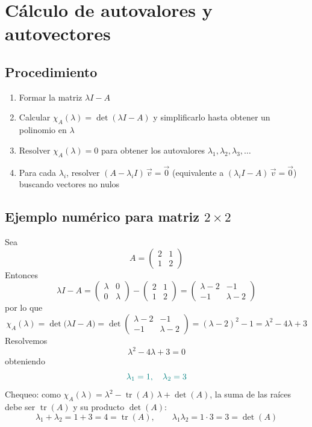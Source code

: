 \documentclass{article}
\newcommand{\vect}[1]{\vec{#1}}
\begin{document}
\section*{Cálculo de autovalores y autovectores}

\subsection*{Procedimiento}
\begin{enumerate}
  \item Formar la matriz \(\lambda I - A\)
  \item Calcular \(\chi_A(\lambda)=\det(\lambda I - A)\) y simplificarlo hasta obtener un polinomio en \(\lambda\)
  \item Resolver \(\chi_A(\lambda)=0\) para obtener los autovalores \(\lambda_1,\lambda_2, \lambda_3,\dots\)
  \item Para cada \(\lambda_i\), resolver
  \( (A - \lambda_i I)\,\vect{v} = \vect{0} \) (equivalente a \( (\lambda_i I - A)\,\vect{v} = \vect{0} \))
  buscando vectores no nulos
\end{enumerate}

\subsection*{Ejemplo numérico para matriz \(2\times2\)}
Sea
\[
A = \begin{pmatrix}
 2 & 1\\
 1 & 2
\end{pmatrix}
\]
Entonces
\[
\lambda I - A
= \begin{pmatrix}
 \lambda & 0\\
 0 & \lambda
\end{pmatrix}
- \begin{pmatrix}
 2 & 1\\
 1 & 2
\end{pmatrix}
= \begin{pmatrix}
 \lambda-2 & -1\\
 -1 & \lambda-2
\end{pmatrix}
\]
por lo que
\[
\chi_A(\lambda)
= \det\bigl(\lambda I - A\bigr)
= \det\begin{pmatrix}
 \lambda-2 & -1\\
 -1 & \lambda-2
\end{pmatrix}
= (\lambda-2)^2 - 1
= \lambda^2 - 4\lambda + 3
\]
Resolvemos
\[
\lambda^2 - 4\lambda + 3 = 0
\]
obteniendo
\[\color{teal}
\lambda_1 = 1,
\quad
\lambda_2 = 3
\]
Chequeo: como \(\chi_A(\lambda)=\lambda^2-\operatorname{tr}(A)\,\lambda+\det(A)\), la suma de las raíces debe ser \(\operatorname{tr}(A)\) y su producto \(\det(A)\):
\[
\lambda_1+\lambda_2=1+3=4=\operatorname{tr}(A),
\qquad
\lambda_1\lambda_2=1\cdot3=3=\det(A)
\]
\end{document}
